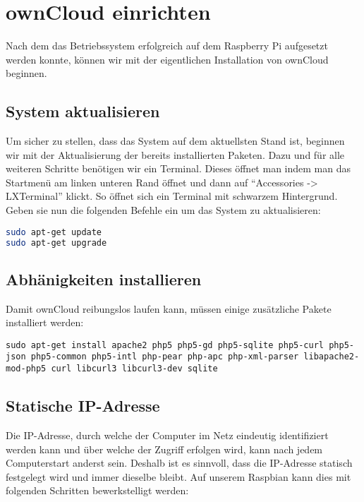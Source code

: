 \section{ownCloud einrichten}
Nach dem das Betriebssystem erfolgreich auf dem Raspberry Pi aufgesetzt werden konnte, können wir mit der eigentlichen Installation von ownCloud beginnen.

\subsection{System aktualisieren}
Um sicher zu stellen, dass das System auf dem aktuellsten Stand ist, beginnen wir mit der Aktualisierung der bereits installierten Paketen.
Dazu und für alle weiteren Schritte benötigen wir ein Terminal. Dieses öffnet man indem man das Startmenü am linken unteren Rand öffnet und dann auf ``Accessories -> LXTerminal'' klickt. So öffnet sich ein Terminal mit schwarzem Hintergrund.  \\
Geben sie nun die folgenden Befehle ein um das System zu aktualisieren:
\begin{lstlisting}[frame=single, language=bash]
sudo apt-get update
sudo apt-get upgrade
\end{lstlisting}

\subsection{Abhänigkeiten installieren}
Damit ownCloud reibungslos laufen kann, müssen einige zusätzliche Pakete installiert werden:

\begin{lstlisting}
sudo apt-get install apache2 php5 php5-gd php5-sqlite php5-curl php5-json php5-common php5-intl php-pear php-apc php-xml-parser libapache2-mod-php5 curl libcurl3 libcurl3-dev sqlite
\end{lstlisting}

\subsection{Statische IP-Adresse}
Die IP-Adresse, durch welche der Computer im Netz eindeutig identifiziert werden kann und über welche der Zugriff erfolgen wird, kann nach jedem Computerstart anderst sein.
Deshalb ist es sinnvoll, dass die IP-Adresse statisch festgelegt wird und immer dieselbe bleibt.
Auf unserem Raspbian kann dies mit folgenden Schritten bewerkstelligt werden:

